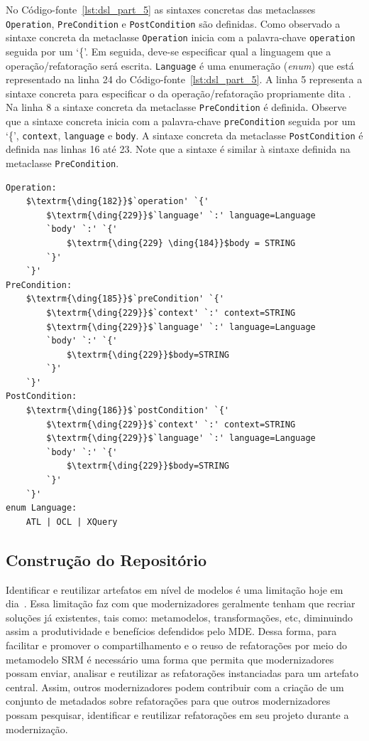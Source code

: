No Código-fonte~\ref{lst:dsl_part_5} as sintaxes concretas das metaclasses \texttt{Operation}, \texttt{PreCondition} e \texttt{PostCondition} são definidas. Como observado a sintaxe concreta da metaclasse \texttt{Operation} inicia com a palavra-chave \texttt{operation} seguida por um `\{'. Em seguida, deve-se especificar qual a linguagem que a operação/refatoração será escrita. \texttt{Language} é uma enumeração (\textit{enum}) que está representado na linha 24 do Código-fonte~\ref{lst:dsl_part_5}. A linha 5 representa a sintaxe concreta para especificar o  da operação/refatoração propriamente dita . Na linha 8 a sintaxe concreta da metaclasse \texttt{PreCondition} é definida. Observe que a sintaxe concreta inicia com a palavra-chave \texttt{preCondition} seguida por um `\{', \texttt{context}, \texttt{language} e \texttt{body}. A sintaxe concreta da metaclasse \texttt{PostCondition} é definida nas linhas 16 até 23. Note que a sintaxe é similar à sintaxe definida na metaclasse \texttt{PreCondition}.
\begin{lstlisting}[language=Xtext, frame=single, basicstyle=\scriptsize, mathescape=true, label={lst:dsl_part_5}, caption={Gramática da DSL - parte 5}]
Operation: 
	$\textrm{\ding{182}}$`operation' `{'
		$\textrm{\ding{229}}$`language' `:' language=Language
		`body' `:' `{'
			$\textrm{\ding{229} \ding{184}}$body = STRING
		`}'
	`}'
PreCondition: 
	$\textrm{\ding{185}}$`preCondition' `{'
		$\textrm{\ding{229}}$`context' `:' context=STRING
		$\textrm{\ding{229}}$`language' `:' language=Language
		`body' `:' `{' 
			$\textrm{\ding{229}}$body=STRING	
		`}'
	`}'
PostCondition: 
	$\textrm{\ding{186}}$`postCondition' `{'
		$\textrm{\ding{229}}$`context' `:' context=STRING
		$\textrm{\ding{229}}$`language' `:' language=Language
		`body' `:' `{' 
			$\textrm{\ding{229}}$body=STRING	
		`}'
	`}'
enum Language: 
	ATL | OCL | XQuery
\end{lstlisting}


\subsection{Construção do Repositório}

Identificar e reutilizar artefatos em nível de modelos é uma limitação hoje em dia~\cite{Rocco_2015}. Essa limitação faz com que modernizadores geralmente tenham que recriar soluções já existentes, tais como: metamodelos, transformações, etc, diminuindo assim a produtividade e benefícios defendidos pelo MDE. Dessa forma, para facilitar e promover o compartilhamento e o reuso de refatorações por meio do metamodelo SRM é necessário uma forma que permita que modernizadores possam enviar, analisar e reutilizar as refatorações instanciadas para um artefato central. Assim, outros modernizadores podem contribuir com a criação de um conjunto de metadados sobre refatorações para que outros modernizadores possam pesquisar, identificar e reutilizar refatorações em seu projeto durante a modernização. 

